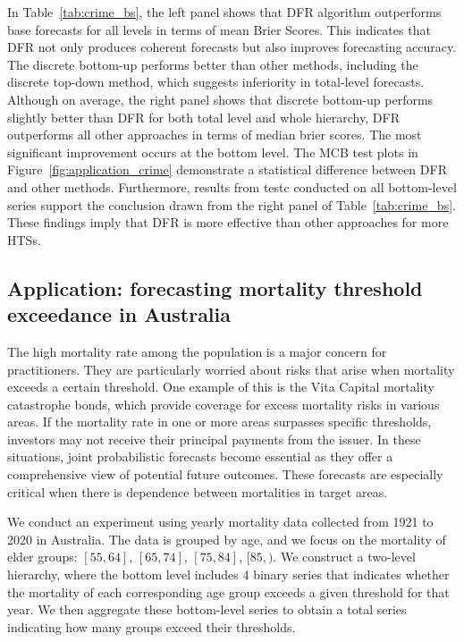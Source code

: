 \documentclass[a4paper,review,12pt,authoryear]{elsarticle}
\begin{document}
     
     In Table~\ref{tab:crime_bs}, the left panel shows that DFR algorithm outperforms base forecasts for all levels in terms of mean Brier Scores. This indicates that DFR not only produces coherent forecasts but also improves forecasting accuracy.
     The discrete bottom-up performs better than other methods, including the discrete top-down method, which suggests inferiority in total-level forecasts. 
     Although on average, the right panel shows that discrete bottom-up performs slightly better than DFR for both total level and whole hierarchy, DFR outperforms all other approaches in terms of median brier scores.
     The most significant improvement occurs at the bottom level.
     The MCB test plots in Figure~\ref{fig:application_crime} demonstrate a statistical difference between DFR and other methods.
     Furthermore, results from testc conducted on all bottom-level series support the conclusion drawn from the right panel of Table~\ref{tab:crime_bs}.
     These findings imply that DFR is more effective than other approaches for more HTSs. 
     
     \subsection{Application: forecasting mortality threshold exceedance in Australia}
     \label{sec:application_mortality}
     The high mortality rate among the population is a major concern for practitioners. 
     They are particularly worried about risks that arise when mortality exceeds a certain threshold. 
     One example of this is the Vita Capital mortality catastrophe bonds, which provide coverage for excess mortality risks in various areas. 
     If the mortality rate in one or more areas surpasses specific thresholds, investors may not receive their principal payments from the issuer.
     In these situations, joint probabilistic forecasts become essential as they offer a comprehensive view of potential future outcomes. 
     These forecasts are especially critical when there is dependence between mortalities in target areas.
     
     We conduct an experiment using yearly mortality data collected from 1921 to 2020 in Australia.
     The data is grouped by age, and we focus on the mortality of elder groups: $[55, 64]$, $[65, 74]$, $[75, 84]$, $[85, )$. 
     We construct a two-level hierarchy, where the bottom level includes 
     $4$ binary series that indicates whether the mortality of each corresponding age group exceeds a given threshold for that year.
     We then aggregate these bottom-level series to obtain a total series indicating how many groups exceed their thresholds.
     
\end{document}
